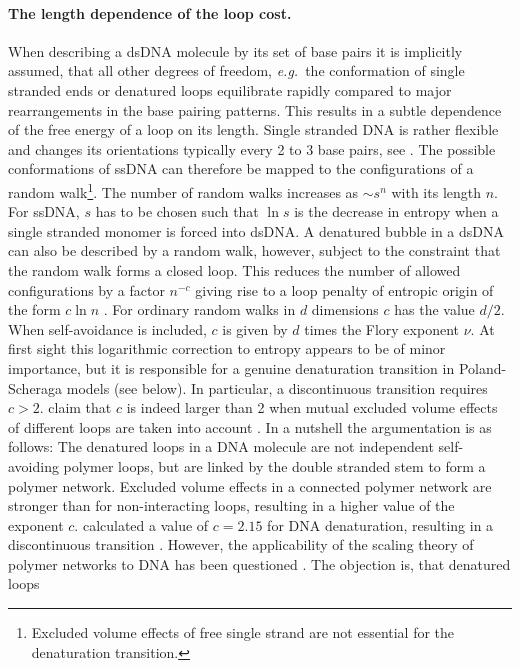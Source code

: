 \paragraph{The length dependence of the loop cost.}
When describing a dsDNA molecule by its set of base pairs it is implicitly assumed, that
all other degrees of freedom, \emph{e.g.}~the conformation of single stranded ends or denatured loops 
equilibrate rapidly compared to major rearrangements in the base pairing patterns. 
This results in a subtle dependence of the free energy of a loop on its length. Single stranded
DNA is rather flexible and changes its orientations typically every 2 to 3 base pairs, see .
The possible conformations of ssDNA can therefore be mapped to the configurations of 
a random walk\footnote{Excluded volume effects of free single strand are not essential for the 
denaturation transition.}. The number of random walks increases as $\sim s^{n}$ with its length $n$. 
For ssDNA, $s$ has to be chosen such that $\ln s$ is the decrease in entropy when 
a single stranded monomer is forced into dsDNA. 
A denatured bubble in a dsDNA can also be described by a random walk, however, subject
to the constraint that the random walk forms a closed loop. This reduces the number of 
allowed configurations by a factor $n^{-c}$ giving rise to a loop penalty of entropic
origin of the form $c\ln n$ \cite{deGennes_79}. For ordinary random walks in $d$ dimensions $c$ has 
the value $d/2$. When self-avoidance is included, $c$ is given by $d$ times the Flory exponent $\nu$. 
At first sight this logarithmic correction to entropy appears to be of minor importance, but it is responsible
for a genuine denaturation transition in Poland-Scheraga models (see below). In particular,
a discontinuous transition requires $c\!>\!2$.
\citeauthor{Kafri_PRL_00} claim that $c$ is indeed larger than 2 when mutual 
excluded volume effects of different loops are taken into account \cite{Kafri_PRL_00}.  
In a nutshell the argumentation is
as follows: The denatured loops in a DNA molecule are not independent self-avoiding
polymer loops, but are linked by the double stranded stem to form a polymer network.
Excluded volume effects in a connected polymer network are stronger than for non-interacting loops, resulting
in a higher value of the exponent $c$. \citeauthor{Kafri_PRL_00} calculated a value of $c=2.15$ for DNA
denaturation, resulting in a discontinuous transition \cite{Kafri_EPJE_02}. 
However, the applicability of the scaling theory of polymer networks to DNA has been 
questioned \cite{Hanke_PRL_03, Kafri_PRLcomment_03}. The objection is, that denatured loops

